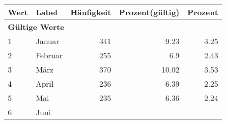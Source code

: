     \begin{longtable}{lXrrr}
     \toprule
     \textbf{Wert} & \textbf{Label} & \textbf{Häufigkeit} & \textbf{Prozent(gültig)} & \textbf{Prozent} \\
     \endhead
     \midrule
     \multicolumn{5}{l}{\textbf{Gültige Werte}}\\

     1 &
     \multicolumn{1}{X}{ Januar   } &


       \num{341} &
       \num[round-mode=places,round-precision=2]{9,23} &
         \num[round-mode=places,round-precision=2]{3,25} \\

     2 &
     \multicolumn{1}{X}{ Februar   } &


       \num{255} &
       \num[round-mode=places,round-precision=2]{6,9} &
         \num[round-mode=places,round-precision=2]{2,43} \\

     3 &
     \multicolumn{1}{X}{ März   } &


       \num{370} &
       \num[round-mode=places,round-precision=2]{10,02} &
         \num[round-mode=places,round-precision=2]{3,53} \\

     4 &
     \multicolumn{1}{X}{ April   } &


       \num{236} &
       \num[round-mode=places,round-precision=2]{6,39} &
         \num[round-mode=places,round-precision=2]{2,25} \\

     5 &
     \multicolumn{1}{X}{ Mai   } &


       \num{235} &
       \num[round-mode=places,round-precision=2]{6,36} &
         \num[round-mode=places,round-precision=2]{2,24} \\

     6 &
     \multicolumn{1}{X}{ Juni   } &



\end{longtable}
